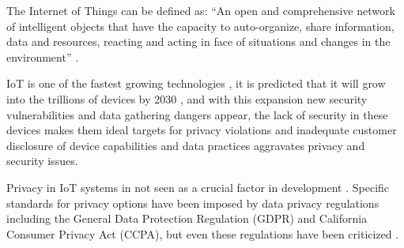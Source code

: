 \documentclass[conference]{IEEEtran}
\begin{document}

The Internet of Things can be defined as: ``An open and comprehensive network
of intelligent objects that have the capacity to auto-organize, share information,
data and resources, reacting and acting in face of situations and changes
in the environment'' \cite{madakam2015internet}.

IoT is one of the fastest growing technologies \cite{MohammadState}, it is
predicted that it will grow into the trillions of devices by 2030 \cite{SarawiInternet},
and with this expansion new security vulnerabilities and data gathering dangers
appear, the lack of security in these devices makes them ideal targets for
privacy violations and inadequate customer disclosure of device capabilities
and data practices aggravates privacy and security issues.

Privacy in IoT systems in not seen as a crucial factor in development \cite{alhirabi2021security}.
Specific standards for privacy options have been imposed by data privacy
regulations including the General Data Protection Regulation (GDPR) and
California Consumer Privacy Act (CCPA), but even these regulations have been
criticized \cite{peloquin2020disruptive, gladis2022weaponizing, gentile2022deficient, green2022flaws, byun2019privacy}.
\end{document}

